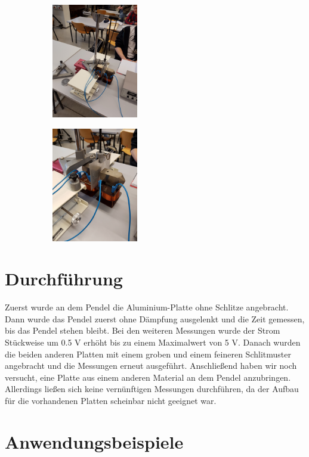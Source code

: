 \begin{figure}
  \centering
  \begin{subfigure}{0.48\textwidth}
    \includegraphics[height=5cm]{20170306_101228.jpg}
  \end{subfigure}
\begin{subfigure}{0.48\textwidth}
    \includegraphics[height=5cm]{20170306_101230.jpg}
  \end{subfigure}
\end{figure}

\section{Durchführung}

Zuerst wurde an dem Pendel die Aluminium-Platte ohne Schlitze angebracht. Dann
wurde das Pendel zuerst ohne Dämpfung ausgelenkt und die Zeit gemessen, bis das
Pendel stehen bleibt. Bei den weiteren Messungen wurde der Strom Stückweise um
0.5 V erhöht bis zu einem Maximalwert von 5 V. Danach wurden die beiden anderen
Platten mit einem groben und einem feineren Schlitmuster angebracht und die Messungen
erneut ausgeführt.
Anschließend haben wir noch versucht, eine Platte aus einem anderen Material an
dem Pendel anzubringen. Allerdings ließen sich keine vernünftigen Messungen
durchführen, da der Aufbau für die vorhandenen Platten scheinbar nicht geeignet
war.


\section{Anwendungsbeispiele}

